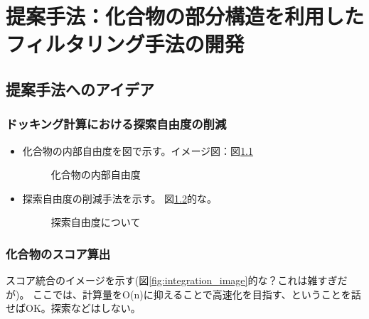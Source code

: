 \chapter{提案手法：化合物の部分構造を利用したフィルタリング手法の開発}



\section{提案手法へのアイデア}
\subsection{ドッキング計算における探索自由度の削減}

\begin{itemize}
\item 化合物の内部自由度を図で示す。イメージ図：図\ref{fig:compound_freedom}
\begin{figure}[htb]
 \begin{center}
  \caption{化合物の内部自由度}
  \label{fig:compound_freedom}
 \end{center}
\end{figure}

\item 探索自由度の削減手法を示す。 図\ref{fig:docking_freedom}的な。
\begin{figure}[htb]
 \begin{center}
  \caption{探索自由度について}
  \label{fig:docking_freedom}
 \end{center}
\end{figure}

\end{itemize}

\subsection{化合物のスコア算出}
スコア統合のイメージを示す(図\ref{fig:integration_image}的な？これは雑すぎだが)。
ここでは、計算量をO(n)に抑えることで高速化を目指す、ということを話せばOK。探索などはしない。

